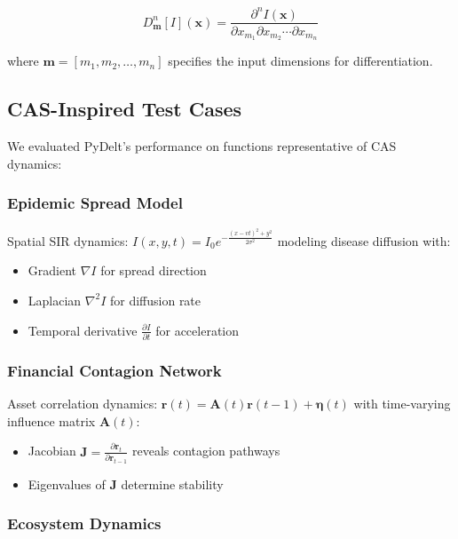 \documentclass[10pt,journal,compsoc]{IEEEtran}
\begin{document}
\begin{equation}
    D^n_{\mathbf{m}}[I](\mathbf{x}) = \frac{\partial^n I(\mathbf{x})}{\partial x_{m_1} \partial x_{m_2} \cdots \partial x_{m_n}}
\end{equation}

where $\mathbf{m} = [m_1, m_2, \ldots, m_n]$ specifies the input dimensions for differentiation.

\subsection{CAS-Inspired Test Cases}

We evaluated PyDelt's performance on functions representative of CAS dynamics:

\subsubsection{Epidemic Spread Model}

Spatial SIR dynamics: $I(x,y,t) = I_0 e^{-\frac{(x-vt)^2 + y^2}{2\sigma^2}}$ modeling disease diffusion with:
\begin{itemize}
    \item Gradient $\nabla I$ for spread direction
    \item Laplacian $\nabla^2 I$ for diffusion rate
    \item Temporal derivative $\frac{\partial I}{\partial t}$ for acceleration
\end{itemize}

\subsubsection{Financial Contagion Network}

Asset correlation dynamics: $\mathbf{r}(t) = \mathbf{A}(t)\mathbf{r}(t-1) + \boldsymbol{\eta}(t)$ with time-varying influence matrix $\mathbf{A}(t)$:
\begin{itemize}
    \item Jacobian $\mathbf{J} = \frac{\partial \mathbf{r}_t}{\partial \mathbf{r}_{t-1}}$ reveals contagion pathways
    \item Eigenvalues of $\mathbf{J}$ determine stability
\end{itemize}

\subsubsection{Ecosystem Dynamics}
\end{document}

